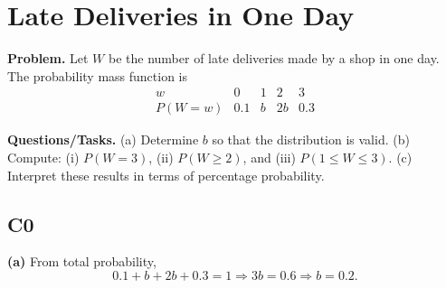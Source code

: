 		
		\section{Late Deliveries in One Day}
		
		\textbf{Problem.}
		Let $W$ be the number of late deliveries made by a shop in one day. The probability mass function is
		\[
		\begin{array}{c|cccc}
			w & 0 & 1 & 2 & 3\\
			\hline
			P(W=w) & 0.1 & b & 2b & 0.3
		\end{array}
		\]
		
		\textbf{Questions/Tasks.}
		(a) Determine $b$ so that the distribution is valid.
		(b) Compute: (i) $P(W=3)$, (ii) $P(W\ge 2)$, and (iii) $P(1\le W\le 3)$.
		(c) Interpret these results in terms of percentage probability.
		
		\subsection*{C0}

		\textbf{(a)} From total probability,
		\[
		0.1+b+2b+0.3=1\Rightarrow 3b=0.6\Rightarrow b=0.2.
		\]


